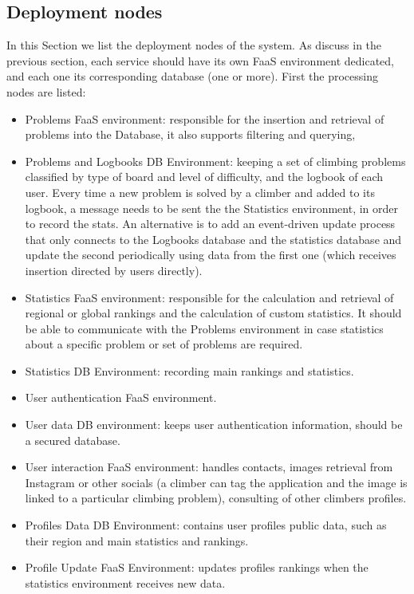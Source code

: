 \documentclass{article}
\begin{document}
\subsection*{Deployment nodes}
In this Section we list the deployment nodes of the system. As discuss in the previous section, each service should have its own FaaS environment dedicated, and each one its corresponding database (one or more).
First the processing nodes are listed:
\begin{itemize}
    \item Problems FaaS environment: responsible for the insertion and retrieval of problems into the Database, it also supports filtering and querying,
    \item Problems and Logbooks DB Environment: keeping a set of climbing problems classified by type of board and level of difficulty, and the logbook of each user. Every time a new problem is solved by a climber and added to its logbook, a message needs to be sent the the Statistics environment, in order to record the stats. An alternative is to add an event-driven update process that only connects to the Logbooks database and the statistics database and update the second periodically using data from the first one (which receives insertion directed by users directly).
    \item Statistics FaaS environment: responsible for the calculation and retrieval of regional or global rankings and the calculation of custom statistics. It should be able to communicate with the Problems environment in case statistics about a specific problem or set of problems are required.
    \item Statistics DB Environment: recording main rankings and statistics.
    \item User authentication FaaS environment.
    \item User data DB environment: keeps user authentication information, should be a secured database.
    \item User interaction FaaS environment: handles contacts, images retrieval	from Instagram or other socials (a climber can tag the application and the image is linked to a particular climbing problem), consulting of other climbers profiles.
    \item Profiles Data DB Environment: contains user profiles public data, such as their region and main statistics and rankings.
    \item Profile Update FaaS Environment: updates profiles rankings when the statistics environment receives new data.  
\end{itemize}
\end{document}
